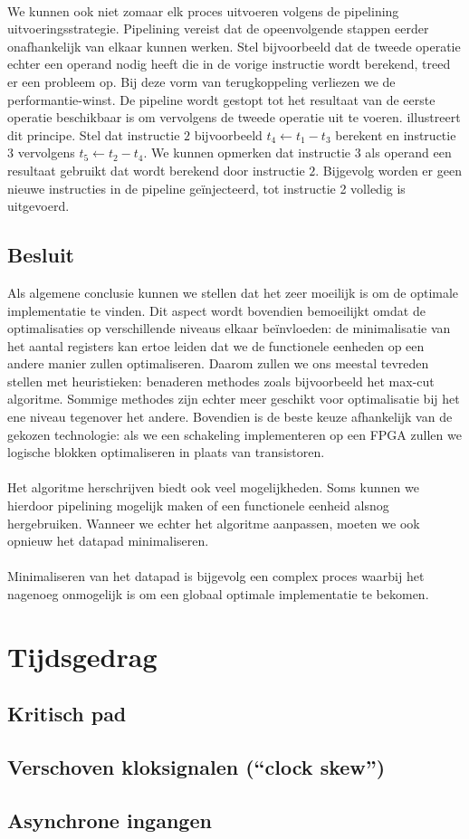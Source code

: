 \paragraph{}
We kunnen ook niet zomaar elk proces uitvoeren volgens de pipelining uitvoeringsstrategie. Pipelining vereist dat de opeenvolgende stappen eerder onafhankelijk van elkaar kunnen werken. Stel bijvoorbeeld dat de tweede operatie echter een operand nodig heeft die in de vorige instructie wordt berekend, treed er een probleem op. Bij deze vorm van terugkoppeling verliezen we de performantie-winst. De pipeline wordt gestopt tot het resultaat van de eerste operatie beschikbaar is om vervolgens de tweede operatie uit te voeren.  illustreert dit principe. Stel dat instructie $2$ bijvoorbeeld $t_4\leftarrow t_1-t_3$ berekent en instructie $3$ vervolgens $t_5\leftarrow t_2-t_4$. We kunnen opmerken dat instructie $3$ als operand een resultaat gebruikt dat wordt berekend door instructie $2$. Bijgevolg worden er geen nieuwe instructies in de pipeline ge\"injecteerd, tot instructie 2 volledig is uitgevoerd.
\subsection{Besluit}
Als algemene conclusie kunnen we stellen dat het zeer moeilijk is om de optimale implementatie te vinden. Dit aspect wordt bovendien bemoeilijkt omdat de optimalisaties op verschillende niveaus elkaar be\"invloeden: de minimalisatie van het aantal registers kan ertoe leiden dat we de functionele eenheden op een andere manier zullen optimaliseren. Daarom zullen we ons meestal tevreden stellen met heuristieken: benaderen methodes zoals bijvoorbeeld het max-cut algoritme. Sommige methodes zijn echter meer geschikt voor optimalisatie bij het ene niveau tegenover het andere. Bovendien is de beste keuze afhankelijk van de gekozen technologie: als we een schakeling implementeren op een FPGA zullen we logische blokken optimaliseren in plaats van transistoren.
\paragraph{}
Het algoritme herschrijven biedt ook veel mogelijkheden. Soms kunnen we hierdoor pipelining mogelijk maken of een functionele eenheid alsnog hergebruiken. Wanneer we echter het algoritme aanpassen, moeten we ook opnieuw het datapad minimaliseren.
\paragraph{}
Minimaliseren van het datapad is bijgevolg een complex proces waarbij het nagenoeg onmogelijk is om een globaal optimale implementatie te bekomen.
\section{Tijdsgedrag}
\label{s:timeFSMD}
\subsection{Kritisch pad}
\subsection{Verschoven kloksignalen (``clock skew'')}
\subsection{Asynchrone ingangen}